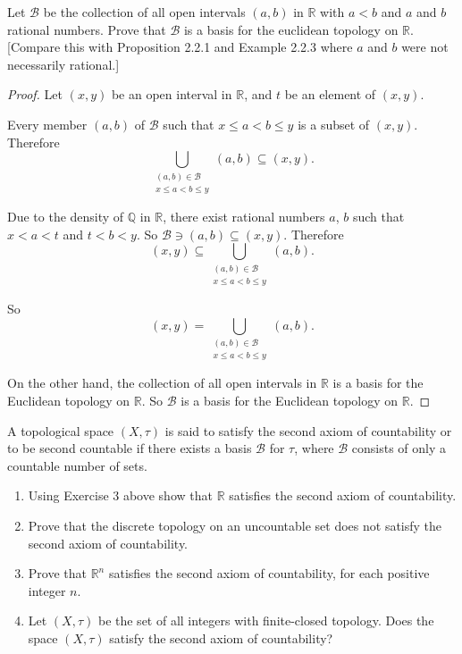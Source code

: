 \begin{exercise}
	Let $\mathcal{B}$ be the collection of all open intervals $(a, b)$ in $\mathbb{R}$ with $a < b$ and $a$ and $b$ rational numbers. Prove that $\mathcal{B}$ is a basis for the euclidean topology on $\mathbb{R}$. [Compare this with Proposition 2.2.1 and Example 2.2.3 where $a$ and $b$ were not necessarily rational.]
\end{exercise}

\begin{proof}
	Let $(x, y)$ be an open interval in $\mathbb{R}$, and $t$ be an element of $(x, y)$.

	Every member $(a, b)$ of $\mathcal{B}$ such that $x\leq a < b \leq y$ is a subset of $(x, y)$. Therefore
	\[
		\bigcup_{\substack{(a, b)\in\mathcal{B} \\ x\leq a < b\leq y }} (a, b) \subseteq (x, y).
	\]

	Due to the density of $\mathbb{Q}$ in $\mathbb{R}$, there exist rational numbers $a$, $b$ such that $x < a < t$ and $t < b < y$. So $\mathcal{B}\ni (a, b)\subseteq (x, y)$. Therefore
	\[
		(x, y)\subseteq \bigcup_{\substack{(a, b)\in\mathcal{B} \\ x\leq a < b\leq y }} (a, b).
	\]

	So
	\[
		(x, y) = \bigcup_{\substack{(a, b)\in\mathcal{B} \\ x\leq a < b\leq y }} (a, b).
	\]

	On the other hand, the collection of all open intervals in $\mathbb{R}$ is a basis for the Euclidean topology on $\mathbb{R}$. So $\mathcal{B}$ is a basis for the Euclidean topology on $\mathbb{R}$.
\end{proof}
\newpage

\begin{exercise}
	A topological space $(X, \tau)$ is said to satisfy the {\color{red}second axiom of countability} or to be {\color{red}second countable} if there exists a basis $\mathcal{B}$ for $\tau$, where $\mathcal{B}$ consists of only a countable number of sets.
	\begin{enumerate}[label={(\roman*)}]
		\item Using Exercise 3 above show that $\mathbb{R}$ satisfies the second axiom of countability.
		\item Prove that the discrete topology on an uncountable set does not satisfy the second axiom of countability.
		\item Prove that $\mathbb{R}^{n}$ satisfies the second axiom of countability, for each positive integer $n$.
		\item Let $(X, \tau)$ be the set of all integers with finite-closed topology. Does the space $(X, \tau)$ satisfy the second axiom of countability?
	\end{enumerate}
\end{exercise}

